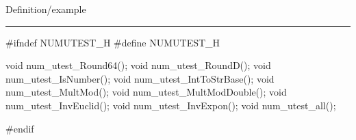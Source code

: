 
Definition/example

\bigskip
\hrule
\code
#ifndef NUMUTEST_H
#define NUMUTEST_H
\endcode

\code

void num_utest_Round64();
void num_utest_RoundD();
void num_utest_IsNumber();
void num_utest_IntToStrBase();
void num_utest_MultMod();
void num_utest_MultModDouble();
void num_utest_InvEuclid();
void num_utest_InvExpon();
void num_utest_all();

#endif
\endcode
